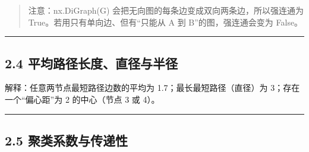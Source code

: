 \begin{Shaded}
\begin{Highlighting}[]
\end{Highlighting}
\end{Shaded}

\begin{quote}
注意：nx.DiGraph(G) 会把无向图的每条边变成双向两条边，所以强连通为
True。若用只有单向边、但有``只能从 A 到 B''的图，强连通会变为 False。
\end{quote}

\begin{center}\rule{0.5\linewidth}{0.5pt}\end{center}

\subsection{2.4
平均路径长度、直径与半径}\label{ux5e73ux5747ux8defux5f84ux957fux5ea6ux76f4ux5f84ux4e0eux534aux5f84}

\begin{Shaded}
\begin{Highlighting}[]
\NormalTok{(}
\NormalTok{(}
\NormalTok{(}
\NormalTok{(}
\end{Highlighting}
\end{Shaded}

\begin{Shaded}
\begin{Highlighting}[]
\end{Highlighting}
\end{Shaded}

解释：任意两节点最短路径边数的平均为 1.7；最长最短路径（直径）为
3；存在一个``偏心距''为 2 的中心（节点 3 或 4）。

\begin{center}\rule{0.5\linewidth}{0.5pt}\end{center}

\subsection{2.5
聚类系数与传递性}\label{ux805aux7c7bux7cfbux6570ux4e0eux4f20ux9012ux6027}

